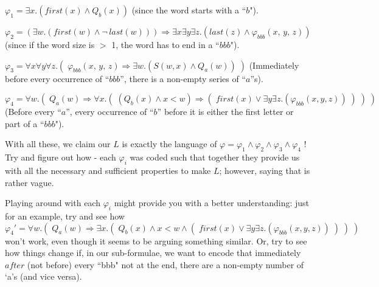 \documentclass{article}
\begin{document}
\begin{flushleft}
$\varphi_1 = \exists x.(first(x) \land Q_b(x))$ (since the word starts with a ``$b$").

$\varphi_2 = (\exists w.(first(w) \land \neg\, last(w))) \Rightarrow \exists x \exists y \exists z.(last(z) \land \varphi_{bbb}(x,\, y,\, z))$ (since if the word size is $>$ 1, the word has to end in a ``$bbb$").

$\varphi_3 = \forall x \forall y \forall z.(\;\varphi_{bbb}(x,\, y,\, z) \Rightarrow \exists w.(S(w, x) \land Q_a(w))\;)$ (Immediately before every occurrence of ``$bbb$'', there is a non-empty series of ``$a$''s).

$\varphi_4 = \forall w.(\; Q_a(w) \Rightarrow \forall x.(\;(Q_b(x) \land x < w) \Rightarrow (\; first(x) \lor \exists y \exists z.(\varphi_{bbb}(x, y, z))\;) \;)\;)$ (Before every ``$a$'', every occurrence of ``$b$'' before it is either the first letter or part of a ``$bbb$").

With all these, we claim our $L$ is exactly the language of $\varphi = \varphi_1 \land \varphi_2 \land \varphi_3 \land \varphi_4$ ! Try and figure out how - each $\varphi_i$ was coded such that together they provide us with all the necessary and sufficient properties to make $L$; however, saying that is rather vague.

Playing around with each $\varphi_i$ might provide you with a better understanding: just for an example, try and see how $\varphi_4' = \forall w.(\; Q_a(w) \Rightarrow \exists x.(\;Q_b(x) \land x < w \land (\; first(x) \lor \exists y \exists z.(\varphi_{bbb}(x, y, z))\;) \;)\;)$ won't work, even though it seems to be arguing something similar. Or, try to see how things change if, in our sub-formulae, we want to encode that immediately $after$ (not before) every ``bbb" not at the end, there are a non-empty number of `a's (and vice versa).
\end{flushleft}
\end{document}
